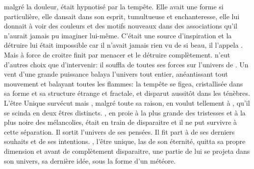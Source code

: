   \Mey malgré la douleur, était hypnotisé par la tempête. Elle avait une forme si particulière, elle dansait dans son esprit, tumultueuse et enchanteresse, elle lui donnait à voir des couleurs et des motifs nouveaux dans des associations qu'il n'aurait jamais pu imaginer lui-même. C'était une source d'inspiration et la détruire lui était impossible car il n'avait jamais rien vu de si beau, il l'appela \Auga. Mais \Auga à force de croitre finit par menacer \Mey et le détruire complètement. \Cind n'eut d'autres choix que d'intervenir: il souffla de toutes ses forces sur l'univers de \Mey. Un vent d'une grande puissance balaya l'univers tout entier, anéantissant tout mouvement et balayant toutes les flammes: la tempête se figea, cristallisée dans sa forme et sa structure étrange et fractale, et disparut aussitôt dans les ténèbres. L'être Unique survécut mais \Mey, malgré toute sa raison, en voulut tellement à \Cind, qu'il se scinda en deux êtres distincts. \Mey, en proie à la plus grande des tristesses et à la plus noire des mélancolies, était en train de disparaitre et il ne put survivre  à cette séparation. Il sortit l'univers de ses pensées. Il fit part à \Cind de ses derniers souhaits et de ses intentions. \Mey, l'être unique, las de son éternité, quitta sa propre dimension et avant de complètement disparaitre, une partie de lui se projeta dans son univers, sa dernière idée, sous la forme d'un météore.
  
  
  
  